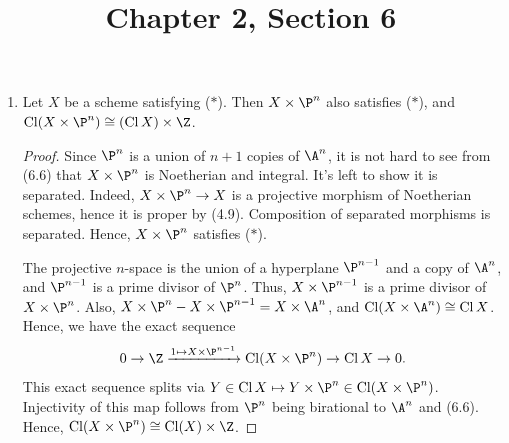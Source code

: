 \documentclass[a4paper]{article}
\title{Chapter 2, Section 6}
\begin{document}
\maketitle
\begin{enumerate} [label=\textbf{\arabic*.}, leftmargin=0em]

\item[\textbf{1.}] Let $X$ be a scheme satisfying ($*$). Then $X \times \P^n$ also satisfies ($*$), and $\cl (X \times \P^n) \cong (\cl X) \times \Z$.

\begin{proof}
    Since $\P^n$ is a union of $n+1$ copies of $\A^n$, it is not hard to see from (6.6) that $X \times \P^n$ is Noetherian and integral. It's left to show it is separated. Indeed, $X \times \P^n \to X$ is a projective morphism of Noetherian schemes, hence it is proper by (4.9). Composition of separated morphisms is separated. Hence, $X \times \P^n$ satisfies ($*$).

    The projective $n$-space is the union of a hyperplane $\P^{n - 1}$ and a copy of $\A^n$, and $\P^{n - 1}$ is a prime divisor of $\P^n$.
    Thus, $X \times \P^{n-1}$ is a prime divisor of $X \times \P^n$.
    Also, $X \times \P^n - X \times \P^{n-1} = X \times \A^n$, and $\cl(X \times \A^n) \cong \cl{X}$.
    Hence, we have the exact sequence
    \begin{equation*}
        0 \to \Z \xrightarrow{1 \mapsto X \times \P^{n-1}} \cl(X \times \P^n) \to \cl{X} \to 0.
    \end{equation*} 
    This exact sequence splits via $Y \in \cl{X} \mapsto Y \times \P^n \in \cl(X \times \P^n)$.
    Injectivity of this map follows from $\P^n$ being birational to $\A^n$ and (6.6).
    Hence, $\cl(X \times \P^n) \cong \cl(X) \times \Z$.
\end{proof}


\end{enumerate}
\end{document}
